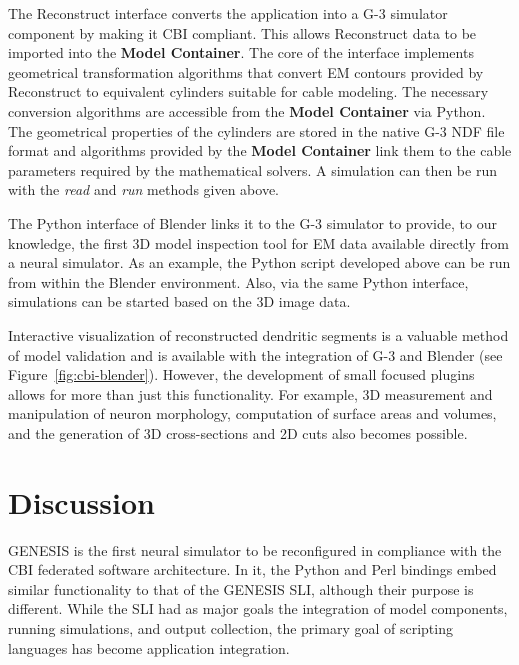 \documentclass[10pt]{article}
\begin{document}
The Reconstruct interface converts the application
into a G-3 simulator component by making it CBI compliant. This allows
Reconstruct data to be imported into the {\bf Model Container}.
The core of the interface implements geometrical transformation
algorithms that convert EM contours provided by Reconstruct to
equivalent cylinders suitable for cable modeling. The necessary conversion algorithms are accessible from the
{\bf Model Container} via Python.
The geometrical properties of the cylinders are stored in the native
G-3 NDF file format and algorithms provided by the {\bf Model Container}
link them to the cable parameters required by the mathematical
solvers.  A simulation can then be run with the {\it read} and {\it
  run} methods given above.

The Python interface of Blender links it to the G-3 simulator to
provide, to our knowledge, the first 3D model inspection tool for EM
data available directly from a neural simulator.  As an example, the
Python script developed above can be run from within the Blender
environment.  Also, via the same Python interface, simulations can be
started based on the 3D image data.

Interactive visualization of reconstructed dendritic segments is a
valuable method of model validation and is available with the
integration of G-3 and Blender (see Figure~\ref{fig:cbi-blender}).
However, the development of small focused plugins allows for more than
just this functionality. For example, 3D measurement and manipulation of
neuron morphology, computation of surface areas and volumes, and the
generation of 3D cross-sections and 2D cuts also becomes possible.

\section*{\LARGE Discussion}

GENESIS is the first neural simulator to be reconfigured in compliance
with the CBI federated software architecture. In it, the Python and Perl bindings embed similar
functionality to that of the GENESIS SLI, although their purpose is different.
While the SLI had as major goals the integration of model components,
running simulations, and output collection, the primary goal of
scripting languages has become application
integration.
\end{document}
